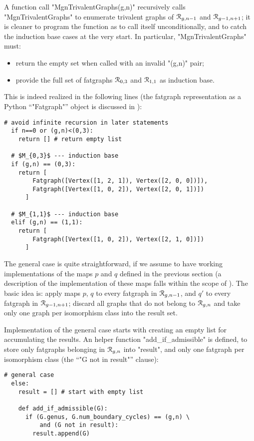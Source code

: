 A function call "MgnTrivalentGraphs(g,n)" recursively calls
"MgnTrivalentGraphs" to enumerate trivalent graphs of $\mathcal{R}_{g,n-1}$
and $\mathcal{R}_{g-1,n+1}$; it is cleaner to program the function as to call itself
unconditionally, and to catch the induction base cases at the very
start.  In particular, "MgnTrivalentGraphs" must:
\begin{itemize}
\item return the empty set when called with an invalid "(g,n)" pair;
\item provide the full set of fatgraphs $\mathcal{R}_{0,3}$ and $\mathcal{R}_{1,1}$ as
  induction base.
\end{itemize}
This is indeed realized in the following lines (the fatgraph
representation as a Python ``"Fatgraph"'' object is discussed in
):
\begin{lstlisting}[name=MgnTrivalentGraphs,firstnumber=6]
  # avoid infinite recursion in later statements
  if n==0 or (g,n)<(0,3):
    return [] # return empty list

  # $M_{0,3}$ --- induction base
  if (g,n) == (0,3):
    return [ 
        Fatgraph([Vertex([1, 2, 1]), Vertex([2, 0, 0])]),
        Fatgraph([Vertex([1, 0, 2]), Vertex([2, 0, 1])]) 
      ]

  # $M_{1,1}$ --- induction base
  elif (g,n) == (1,1):
    return [ 
        Fatgraph([Vertex([1, 0, 2]), Vertex([2, 1, 0])]) 
      ]
\end{lstlisting}

The general case is quite straightforward, if we assume to have
working implementations of the maps $p$ and $q$ defined in the
previous section (a description of the implementation of these maps
falls within the scope of ).  The basic
idea is: apply maps $p$, $q$ to every fatgraph in $\mathcal{R}_{g,n-1}$, and
$q'$ to every fatgraph in $\mathcal{R}_{g-1,n+1}$; discard all graphs that do
not belong to $\mathcal{R}_{g,n}$ and take only one graph per isomorphism class
into the result set.

Implementation of the general case starts with creating an empty list
for accumulating the results.  An helper function
"add_if_admissible" is defined, to store only fatgraphs belonging in
$\mathcal{R}_{g,n}$ into "result", and only one fatgraph per isomorphism
class (the ``"G not in result"'' clause):
\begin{lstlisting}[name=MgnTrivalentGraphs,firstnumber=22]
  # general case
  else:
    result = [] # start with empty list

    def add_if_admissible(G):
      if (G.genus, G.num_boundary_cycles) == (g,n) \
          and (G not in result):
        result.append(G)
      
\end{lstlisting}

